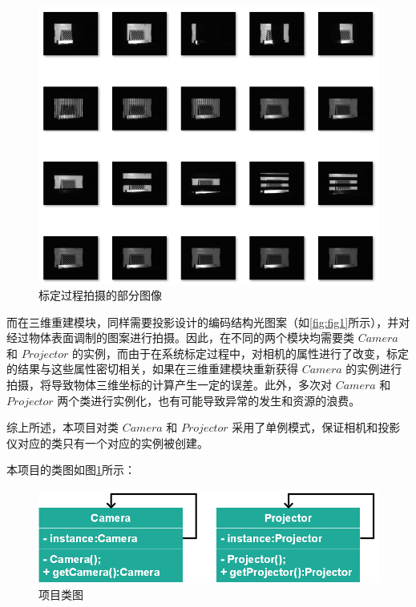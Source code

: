 \documentclass[article]{BJTU-thesis}
\begin{document}
		 	\begin{figure}[!htbp]
		\centering
		\includegraphics[scale=1]{9.png}
		\caption{标定过程拍摄的部分图像}
	\end{figure}

	而在三维重建模块，同样需要投影设计的编码结构光图案（如\ref{fig:fig1}所示），并对经过物体表面调制的图案进行拍摄。因此，在不同的两个模块均需要类 $Camera$ 和 $Projector$ 的实例，而由于在系统标定过程中，对相机的属性进行了改变，标定的结果与这些属性密切相关，如果在三维重建模块重新获得 $Camera$ 的实例进行拍摄，将导致物体三维坐标的计算产生一定的误差。此外，多次对 $Camera$ 和 $Projector$ 两个类进行实例化，也有可能导致异常的发生和资源的浪费。
	
	综上所述，本项目对类 $Camera$ 和 $Projector$ 采用了单例模式，保证相机和投影仪对应的类只有一个对应的实例被创建。
	
	本项目的类图如图\ref{fig:fig5}所示：
		\begin{figure}[!htbp]
		\centering
		\includegraphics[scale=0.7]{13.png}
		\caption{项目类图}
		\label{fig:fig5}
	\end{figure}
	
\end{document}
